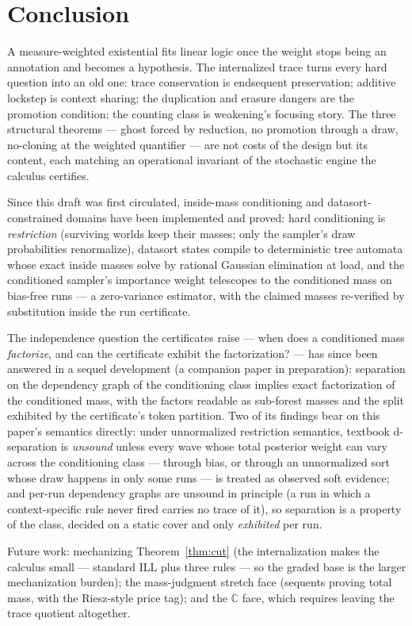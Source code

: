 \documentclass[11pt]{article}
\newcommand{\CC}{\mathbb{C}}                     %
\theoremstyle{definition}
\theoremstyle{remark}
\begin{document}
\section{Conclusion}
\label{sec:conclusion}

A measure-weighted existential fits linear logic once the weight stops
being an annotation and becomes a hypothesis.  The internalized trace
turns every hard question into an old one: trace conservation is
endsequent preservation; additive lockstep is context sharing; the
duplication and erasure dangers are the promotion condition; the
counting class is weakening's focusing story.  The three structural
theorems --- ghost forced by reduction, no promotion through a draw,
no-cloning at the weighted quantifier --- are not costs of the design
but its content, each matching an operational invariant of the
stochastic engine the calculus certifies.

Since this draft was first circulated, inside-mass conditioning and
datasort-constrained domains have been implemented and proved: hard
conditioning is \emph{restriction} (surviving worlds keep their masses;
only the sampler's draw probabilities renormalize), datasort states
compile to deterministic tree automata whose exact inside masses solve
by rational Gaussian elimination at load, and the conditioned sampler's
importance weight telescopes to the conditioned mass on bias-free runs
--- a zero-variance estimator, with the claimed masses re-verified by
substitution inside the run certificate.

The independence question the certificates raise --- when does a
conditioned mass \emph{factorize}, and can the certificate exhibit the
factorization? --- has since been answered in a sequel development (a
companion paper in preparation): separation on the dependency graph of
the conditioning class implies exact factorization of the conditioned
mass, with the factors readable as sub-forest masses and the split
exhibited by the certificate's token partition.  Two of its findings
bear on this paper's semantics directly: under unnormalized
restriction semantics, textbook d-separation is \emph{unsound} unless
every wave whose total posterior weight can vary across the
conditioning class --- through bias, or through an unnormalized sort
whose draw happens in only some runs --- is treated as observed soft
evidence; and per-run dependency graphs are unsound in principle (a
run in which a context-specific rule never fired carries no trace of
it), so separation is a property of the class, decided on a static
cover and only \emph{exhibited} per run.

Future work: mechanizing Theorem~\ref{thm:cut} (the internalization
makes the calculus small --- standard ILL plus three rules --- so the
graded base is the larger mechanization burden); the mass-judgment
stretch face (sequents proving total mass, with the Riesz-style price
tag); and the $\CC$ face, which requires leaving the trace
quotient altogether.



\end{document}
